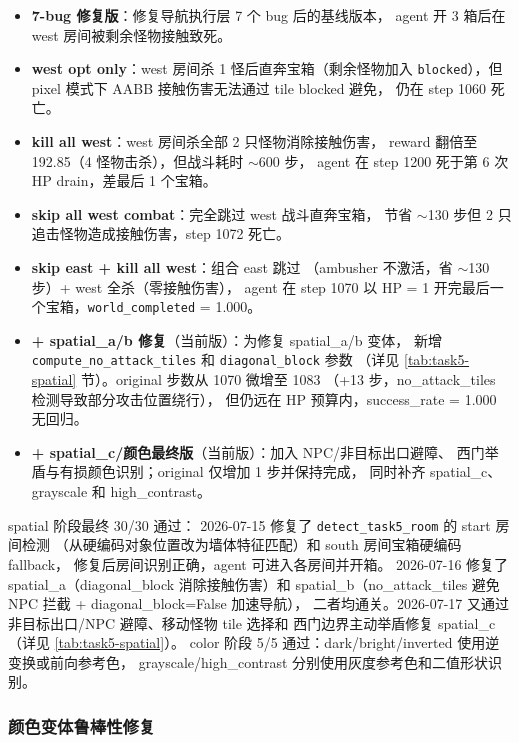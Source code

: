 \documentclass[12pt,a4paper]{ctexart}
\begin{document}
\begin{itemize}[leftmargin=2em]
  \item \textbf{7-bug 修复版}：修复导航执行层 7 个 bug 后的基线版本，
  agent 开 3 箱后在 west 房间被剩余怪物接触致死。
  \item \textbf{west opt only}：west 房间杀 1 怪后直奔宝箱（剩余怪物加入
  \texttt{blocked}），但 pixel 模式下 AABB 接触伤害无法通过 tile blocked 避免，
  仍在 step 1060 死亡。
  \item \textbf{kill all west}：west 房间杀全部 2 只怪物消除接触伤害，
  reward 翻倍至 192.85（4 怪物击杀），但战斗耗时 $\sim$600 步，
  agent 在 step 1200 死于第 6 次 HP drain，差最后 1 个宝箱。
  \item \textbf{skip all west combat}：完全跳过 west 战斗直奔宝箱，
  节省 $\sim$130 步但 2 只追击怪物造成接触伤害，step 1072 死亡。
  \item \textbf{skip east + kill all west}：组合 east 跳过
  （ambusher 不激活，省 $\sim$130 步）+ west 全杀（零接触伤害），
  agent 在 step 1070 以 HP = 1 开完最后一个宝箱，\texttt{world\_completed} = 1.000。
  \item \textbf{+ spatial\_a/b 修复}（当前版）：为修复 spatial\_a/b 变体，
  新增 \texttt{compute\_no\_attack\_tiles} 和 \texttt{diagonal\_block} 参数
  （详见 \ref{tab:task5-spatial} 节）。original 步数从 1070 微增至 1083
 （+13 步，no\_attack\_tiles 检测导致部分攻击位置绕行），
  但仍远在 HP 预算内，success\_rate = 1.000 无回归。
  \item \textbf{+ spatial\_c/颜色最终版}（当前版）：加入 NPC/非目标出口避障、
  西门举盾与有损颜色识别；original 仅增加 1 步并保持完成，
  同时补齐 spatial\_c、grayscale 和 high\_contrast。
\end{itemize}

spatial 阶段最终 30/30 通过：
2026-07-15 修复了 \texttt{detect\_task5\_room} 的 start 房间检测
（从硬编码对象位置改为墙体特征匹配）和 south 房间宝箱硬编码 fallback，
修复后房间识别正确，agent 可进入各房间并开箱。
2026-07-16 修复了 spatial\_a（diagonal\_block 消除接触伤害）和
spatial\_b（no\_attack\_tiles 避免 NPC 拦截 + diagonal\_block=False 加速导航），
二者均通关。2026-07-17 又通过非目标出口/NPC 避障、移动怪物 tile 选择和
西门边界主动举盾修复 spatial\_c（详见 \ref{tab:task5-spatial}）。
color 阶段 5/5 通过：dark/bright/inverted 使用逆变换或前向参考色，
grayscale/high\_contrast 分别使用灰度参考色和二值形状识别。

\subsubsection{颜色变体鲁棒性修复}
\label{sec:color-variant-fix}
\end{document}
